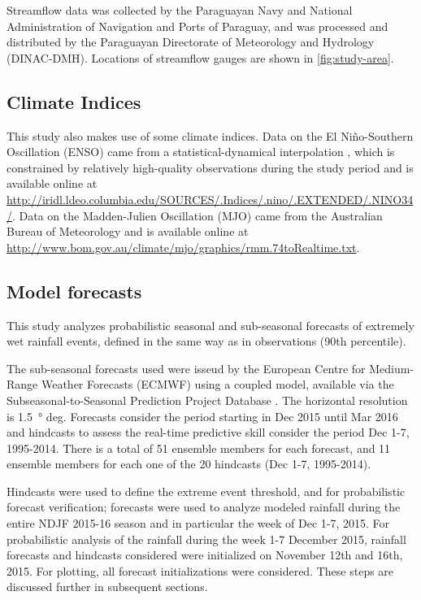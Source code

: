 \documentclass[twocol]{ametsoc}
\begin{document}
Streamflow data was collected by the Paraguayan Navy and National Administration of Navigation and Ports of Paraguay, and was processed and distributed by the Paraguayan Directorate of Meteorology and Hydrology (DINAC-DMH).
Locations of streamflow gauges are shown in \cref{fig:study-area}.

\subsection{Climate Indices}

This study also makes use of some climate indices.
Data on the El Ni\~{n}o-Southern Oscillation (ENSO) came from a statistical-dynamical interpolation \citep{Kaplan:1998df}, which is constrained by relatively high-quality observations during the study period and is available online at \url{http://iridl.ldeo.columbia.edu/SOURCES/.Indices/.nino/.EXTENDED/.NINO34/}.
Data on the Madden-Julien Oscillation (MJO) came from the Australian Bureau of Meteorology and is available online at \url{http://www.bom.gov.au/climate/mjo/graphics/rmm.74toRealtime.txt}.


\subsection{Model forecasts}



This study analyzes probabilistic seasonal and sub-seasonal forecasts of extremely wet rainfall events, defined in the same way as in observations (90th percentile).

The sub-seasonal forecasts used were isseud by the European Centre for Medium-Range Weather Forecasts (ECMWF) using a coupled model, available via the Subseasonal-to-Seasonal Prediction Project Database \citep{Vitart2016}.
The horizontal resolution is \SI{1.5}{\degree} deg.
Forecasts consider the period starting in Dec 2015 until Mar 2016 and hindcasts to assess the real-time predictive skill consider the period Dec 1-7, 1995-2014.
There is a total of 51 ensemble members for each forecast, and 11 ensemble members for each one of the 20 hindcasts (Dec 1-7, 1995-2014).

Hindcasts were used to define the extreme event threshold, and for probabilistic forecast verification; forecasts were used to analyze modeled rainfall during the entire NDJF 2015-16 season and in particular the week of Dec 1-7, 2015.
For probabilistic analysis of the rainfall during the week 1-7 December 2015, rainfall forecasts and hindcasts considered were initialized on November 12th and 16th, 2015.
For plotting, all forecast initializations were considered.
These steps are discussed further in subsequent sections.
\end{document}
